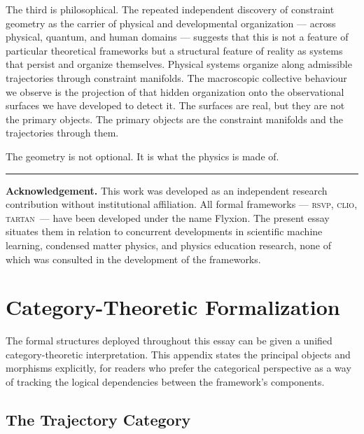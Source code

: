 \documentclass[11pt,a4paper]{article}
\theoremstyle{plain}
\theoremstyle{definition}
\theoremstyle{remark}
\newcommand{\RSVP}{\textup{\textsc{rsvp}}}
\newcommand{\CLIO}{\textup{\textsc{clio}}}
\newcommand{\TARTAN}{\textup{\textsc{tartan}}}
\begin{document}
The third is philosophical. The repeated independent discovery of constraint
geometry as the carrier of physical and developmental organization --- across
physical, quantum, and human domains --- suggests that this is not a feature
of particular theoretical frameworks but a structural feature of reality as
systems that persist and organize themselves. Physical systems organize
along admissible trajectories through constraint manifolds. The macroscopic
collective behaviour we observe is the projection of that hidden organization
onto the observational surfaces we have developed to detect it. The surfaces
are real, but they are not the primary objects. The primary objects are
the constraint manifolds and the trajectories through them.

The geometry is not optional. It is what the physics is made of.


\vspace{2em}
\noindent\rule{\linewidth}{0.4pt}
\vspace{0.5em}

{\small\noindent\textbf{Acknowledgement.} This work was developed as an
independent research contribution without institutional affiliation.
All formal frameworks --- \RSVP, \CLIO, \TARTAN\ --- have been developed
under the name Flyxion. The present essay situates them in relation to
concurrent developments in scientific machine learning, condensed matter
physics, and physics education research, none of which was consulted in
the development of the frameworks.}

\vspace{2em}

\appendix

\section{Category-Theoretic Formalization}
\label{app:category}

The formal structures deployed throughout this essay can be given a unified
category-theoretic interpretation. This appendix states the principal
objects and morphisms explicitly, for readers who prefer the categorical
perspective as a way of tracking the logical dependencies between the
framework's components.

\subsection*{The Trajectory Category}
\end{document}
